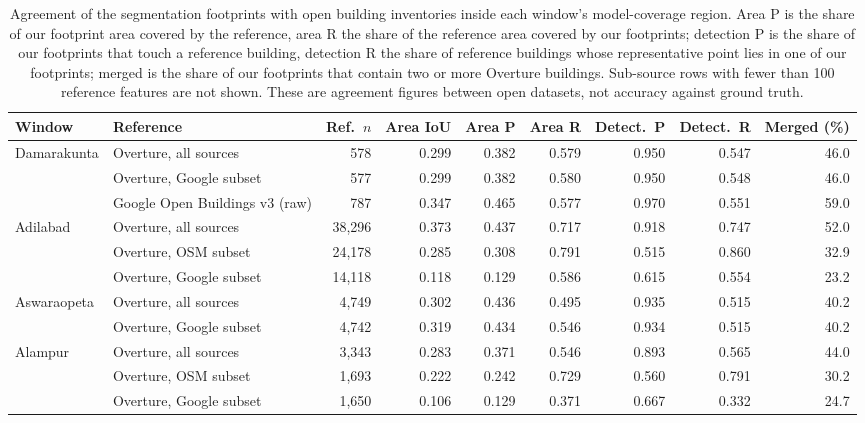 \documentclass[10pt,a4paper,twocolumn]{article}
\begin{document}
\begin{table}[tbp]
\caption{Agreement of the segmentation footprints with open building inventories inside each window's model-coverage region. Area P is the share of our footprint area covered by the reference, area R the share of the reference area covered by our footprints; detection P is the share of our footprints that touch a reference building, detection R the share of reference buildings whose representative point lies in one of our footprints; merged is the share of our footprints that contain two or more Overture buildings. Sub-source rows with fewer than 100 reference features are not shown. These are agreement figures between open datasets, not accuracy against ground truth.}
\label{tab:xval}
\centering
\scriptsize
\begin{tabular}{@{}llrrrrrrr@{}}
\toprule
Window & Reference & Ref.\ $n$ & Area IoU & Area P & Area R & Detect.\ P & Detect.\ R & Merged (\%)\\
\midrule
Damarakunta & Overture, all sources & 578 & 0.299 & 0.382 & 0.579 & 0.950 & 0.547 & 46.0\\
 & Overture, Google subset & 577 & 0.299 & 0.382 & 0.580 & 0.950 & 0.548 & 46.0\\
 & Google Open Buildings v3 (raw) & 787 & 0.347 & 0.465 & 0.577 & 0.970 & 0.551 & 59.0\\
\addlinespace
Adilabad & Overture, all sources & 38{,}296 & 0.373 & 0.437 & 0.717 & 0.918 & 0.747 & 52.0\\
 & Overture, OSM subset & 24{,}178 & 0.285 & 0.308 & 0.791 & 0.515 & 0.860 & 32.9\\
 & Overture, Google subset & 14{,}118 & 0.118 & 0.129 & 0.586 & 0.615 & 0.554 & 23.2\\
\addlinespace
Aswaraopeta & Overture, all sources & 4{,}749 & 0.302 & 0.436 & 0.495 & 0.935 & 0.515 & 40.2\\
 & Overture, Google subset & 4{,}742 & 0.319 & 0.434 & 0.546 & 0.934 & 0.515 & 40.2\\
\addlinespace
Alampur & Overture, all sources & 3{,}343 & 0.283 & 0.371 & 0.546 & 0.893 & 0.565 & 44.0\\
 & Overture, OSM subset & 1{,}693 & 0.222 & 0.242 & 0.729 & 0.560 & 0.791 & 30.2\\
 & Overture, Google subset & 1{,}650 & 0.106 & 0.129 & 0.371 & 0.667 & 0.332 & 24.7\\
\bottomrule
\end{tabular}
\end{table}
\end{document}
